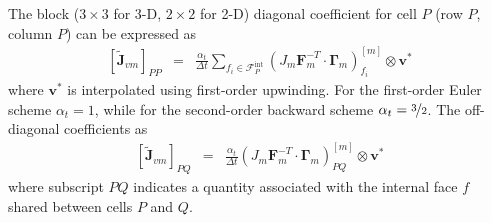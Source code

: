\documentclass[sn-mathphys,Numbered]{sn-jnl}%
\newcommand{\bb}{\boldsymbol}
\begin{document}
The block ($3\times3$ for 3-D, $2\times2$ for 2-D) diagonal coefficient for cell $P$ (row $P$, column $P$) can be expressed as
\begin{eqnarray}
	 \left[ \tilde{\bb{J}}_{vm} \right]_{PP} &=&
		 \frac{\alpha_t}{\Delta t} \sum_{f_i \in \mathcal{F}^{\text{int}}_P}  \left(J_m \bb{F}_m^{-T} \cdot \bb{\Gamma}_m \right)_{f_i}^{[m]} \otimes \bb{v}^*
\end{eqnarray}
where $\bb{v}^*$ is interpolated using first-order upwinding.
For the first-order Euler scheme $\alpha_t = 1$, while for the second-order backward scheme $\alpha_t = \nicefrac{3}{2}$.
The off-diagonal coefficients as
\begin{eqnarray}
	 \left[ \tilde{\bb{J}}_{vm} \right]_{PQ} &=&
	 	 \frac{\alpha_t}{\Delta t} \left(J_m \bb{F}_m^{-T} \cdot \bb{\Gamma}_m \right)_{PQ}^{[m]} \otimes \bb{v}^*
\end{eqnarray}
where subscript $PQ$ indicates a quantity associated with the internal face $f$ shared between cells $P$ and $Q$.

\end{document}
